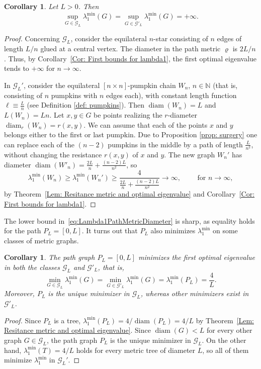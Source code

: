 \documentclass[reqno]{amsart}
\theoremstyle{plain}
\newtheorem{cor}[thm]{Corollary}
\theoremstyle{definition}
\theoremstyle{remark}
\numberwithin{equation}{section}
\newcommand{\N}{\mathbb{N}}     %
\newcommand{\diam}{\operatorname{diam}}
\begin{document}
\begin{cor}
	Let $L >0$. Then
	\[
	\sup_{G \in \mathscr{G}_L} \lambda_1^{\min}(G) = \sup_{G \in \mathscr{G}'_L} \lambda_1^{\min}(G) = + \infty.
	\]
\end{cor}
\begin{proof}
	Concerning $\mathscr{G}_L$, consider the equilateral $n$-star consisting of $n$ edges of length $L/n$ glued at a central vertex. The diameter in the path metric $\varrho$ is $2L/n$. Thus, by Corollary~\ref{Cor: First bounds for lambda1}, the first optimal eigenvalue tends to $+ \infty$ for $n \to \infty$.
	
	
	In $\mathscr{G}_L'$, consider the equilateral $[n\times  n]$-pumpkin chain $W_n$, $n \in \N$ (that is, consisting of $n$ pumpkins with $n$ edges each), with constant length function $\ell \equiv \frac{L}{n}$ (see Definition \ref{def: pumpkins}). Then $\diam (W_n) = L$ and $L(W_n) = L n$. Let $x,y \in G$ be points realizing the $r$-diameter $\diam_r(W_n) = r(x,y)$. We can assume that each of the points $x$ and $y$ belongs either to the first or last pumpkin. Due to Proposition \ref{prop: surgery} one can replace each of the $(n-2)$ pumpkins in the middle by a path of length $\frac{L}{n^2}$, without changing the resistance $r(x,y)$ of $x$ and $y$. The new graph $W_n'$ has diameter $\diam(W'_n) =\frac{2L}{n} + \frac{(n-2)L}{n^2}$, so
	\[
	\lambda_{1}^{\min}(W_n) \geq \lambda_{1}^{\min}(W_n') \geq  \frac{4}{\frac{2L}{n} + \frac{(n-2)L}{n^2}} \to \infty, \qquad \text{ for } n \to \infty,
	\]
	by Theorem~\ref{Lem: Resitance metric and optimal eigenvalue} and Corollary~\ref{Cor: First bounds for lambda1}.
\end{proof}

The lower bound in~\eqref{eq:Lambda1PathMetricDiameter} is sharp, as equality holds for the path $P_L =[0,L]$. It turns out that $P_L$ also minimizes $\lambda_1^{\min}$ on some classes of metric graphs.

\begin{cor}
	The path graph $P_L = [0,L]$ minimizes the first optimal eigenvalue in both the classes $\mathscr{G}_L$ and $\mathscr{G}'_L$, that is,
	\[
	\min_{G \in \mathscr{G}_L} \lambda_1^{\min} (G) = \min_{G \in \mathscr{G}'_L} \lambda_1^{\min} (G) = \lambda_1^{\min} (P_L) = \frac{4}{L}.
	\]
	Moreover, $P_L$ is the unique minimizer in $\mathscr{G}_L$, whereas other minimizers exist in $\mathscr{G}'_L$.
\end{cor}
\begin{proof}
	Since $P_L$ is a tree, $\lambda_1^{\min}(P_L) = 4/\diam(P_L) = 4/L$ by Theorem~\ref{Lem: Resitance metric and optimal eigenvalue}. Since $\diam(G) < L$ for every other graph $G \in \mathscr{G}_L$, the path graph $P_L$ is the unique minimizer  in $\mathscr{G}_L$. On the other hand, $\lambda_1^{\min}(T) = 4/L$ holds for every metric tree of diameter $L$, so all of them minimize $\lambda_1^{\min}$ in $\mathscr{G}_L'$.
\end{proof}
\end{document}
